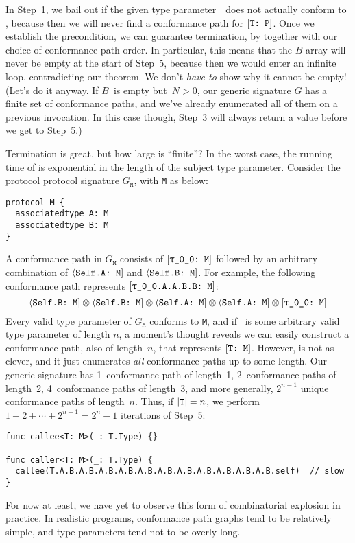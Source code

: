 \documentclass[../generics]{subfiles}
\begin{document}
In Step~1, we bail out if the given type parameter~\tT\ does not actually conform to \tP, because then we will never find a conformance path for $[\texttt{T:~P}]$. Once we establish the precondition, we can guarantee termination, by  together with our choice of conformance path order. In particular, this means that the $B$ array will never be empty at the start of Step~5, because then we would enter an infinite loop, contradicting our theorem. We don't \emph{have to} show why it cannot be empty! (Let's do it anyway. If $B$~is empty but~$N>0$, our generic signature $G$ has a finite set of conformance paths, and we've already enumerated all of them on a previous invocation. In this case though, Step~3 will always return a value before we get to Step~5.)

\begin{example}\label{free monoid first time}
Termination is great, but how large is ``finite''? In the worst case, the running time of  is exponential in the length of the subject type parameter. Consider the protocol protocol signature $G_\texttt{M}$, with \texttt{M} as below:
\begin{Verbatim}
protocol M {
  associatedtype A: M
  associatedtype B: M
}
\end{Verbatim}
A conformance path in $G_{\texttt{M}}$ consists of $\ConfReq{\rT}{M}$ followed by an arbitrary combination of $\langle\texttt{Self.A:~M}]$ and $\langle\texttt{Self.B:~M}]$. For example, the following conformance path represents $\ConfReq{\rT.A.A.B.B}{M}$:
\[
\AssocConf{Self.B}{M} \otimes \AssocConf{Self.B}{M} \otimes \AssocConf{Self.A}{M} \otimes \AssocConf{Self.A}{M} \otimes \ConfReq{\rT}{M}
\]
Every valid type parameter of $G_\texttt{M}$ conforms to \texttt{M}, and if \tT\ is some arbitrary valid type parameter of length $n$, a moment's thought reveals we can easily construct a conformance path, also of length~$n$, that represents $[\texttt{T:~M}]$. However,  is not as clever, and it just enumerates \emph{all} conformance paths up to some length. Our generic signature has 1~conformance path of length~1, 2~conformance paths of length~2, 4~conformance paths of length~3, and more generally, $2^{n-1}$ unique conformance paths of length~$n$. Thus, if $|\texttt{T}|=n$, we perform $1+2+\cdots+2^{n-1}=2^n-1$ iterations of Step~5:
\begin{Verbatim}
func callee<T: M>(_: T.Type) {}

func caller<T: M>(_: T.Type) {
  callee(T.A.B.A.B.A.B.A.B.A.B.A.B.A.B.A.B.A.B.A.B.A.B.self)  // slow
}
\end{Verbatim}
For now at least, we have yet to observe this form of combinatorial explosion in practice. In realistic programs, conformance path graphs tend to be relatively simple, and type parameters tend not to be overly long.
\end{example}
\end{document}
